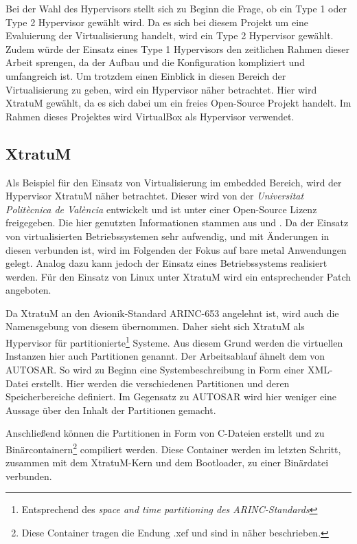\documentclass[
  a4paper,					    %
  twoside,
  DIV=calc,     				%
  bibliography=totoc,
  cleardoublepage=empty,
  ngerman,     					%
  final       					%
]{scrbook}
\begin{document}
Bei der Wahl des Hypervisors stellt sich zu Beginn die Frage, ob ein Type 1 oder Type 2 Hypervisor gewählt wird. Da es sich bei diesem Projekt um eine Evaluierung der Virtualisierung handelt, wird ein Type 2 Hypervisor gewählt. Zudem würde der Einsatz eines Type 1 Hypervisors den zeitlichen Rahmen dieser Arbeit sprengen, da der Aufbau und die Konfiguration kompliziert und umfangreich ist. Um trotzdem einen Einblick in diesen Bereich der Virtualisierung zu geben, wird ein Hypervisor näher betrachtet. Hier wird XtratuM gewählt, da es sich dabei um ein freies Open-Source Projekt handelt. Im Rahmen dieses Projektes wird VirtualBox als Hypervisor verwendet.

\subsection{XtratuM}
\label{sec:xtratum}
Als Beispiel für den Einsatz von Virtualisierung im embedded Bereich, wird der Hypervisor XtratuM näher betrachtet. Dieser wird von der \emph{Universitat Politècnica de València} entwickelt und ist unter einer Open-Source Lizenz freigegeben. Die hier genutzten Informationen stammen aus \cite{xm:usermanual} und \cite{xm:reference}. Da der Einsatz von virtualisierten Betriebssystemen sehr aufwendig, und mit Änderungen in diesen verbunden ist, wird im Folgenden der Fokus auf bare metal Anwendungen gelegt. Analog dazu kann jedoch der Einsatz eines Betriebssystems realisiert werden. Für den Einsatz von Linux unter XtratuM wird ein entsprechender Patch angeboten.

Da XtratuM an den Avionik-Standard ARINC-653 angelehnt ist, wird auch die Namensgebung von diesem übernommen. Daher sieht sich XtratuM als Hypervisor für partitionierte\footnote{Entsprechend des \emph{space and time partitioning des ARINC-Standards}} Systeme. Aus diesem Grund werden die virtuellen Instanzen hier auch Partitionen genannt. Der Arbeitsablauf ähnelt dem von AUTOSAR. So wird zu Beginn eine Systembeschreibung in Form einer XML-Datei erstellt. Hier werden die verschiedenen Partitionen und deren Speicherbereiche definiert. Im Gegensatz zu AUTOSAR wird hier weniger eine Aussage über den Inhalt der Partitionen gemacht.

Anschließend können die Partitionen in Form von C-Dateien erstellt und zu Binärcontainern\footnote{Diese Container tragen die Endung .xef und sind in \cite[Seite 68]{xm:usermanual} näher beschrieben.} compiliert werden. Diese Container werden im letzten Schritt, zusammen mit dem XtratuM-Kern und dem Bootloader, zu einer Binärdatei verbunden.
\end{document}
